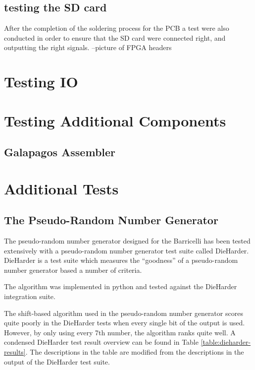 \subsection{testing the SD card}
After the completion of the soldering process for the PCB a test were also conducted in order to ensure that the 
SD card were connected right, and outputting the right signals. 
--picture of FPGA headers

\section{Testing IO}


\section{Testing Additional Components}

\subsection{Galapagos Assembler}


\section{Additional Tests}

\subsection{The Pseudo-Random Number Generator}


The pseudo-random number generator designed for the Barricelli has been tested extensively with a pseudo-random number generator test suite called DieHarder\cn.
DieHarder is a test suite which measures the ``goodness'' of a pseudo-random number generator based a number of criteria.

The algorithm was implemented in python and tested against the DieHarder integration suite\cn.

The shift-based algorithm used in the pseudo-random number generator scores quite poorly in the DieHarder tests when every single bit of the output is used.
However, by only using every 7th number\cn, the algorithm ranks quite well.
A condensed DieHarder test result overview can be found in Table \vref{table:dieharder-results}.
The descriptions in the table are modified from the descriptions in the output of the DieHarder test suite.

